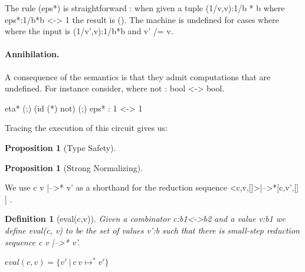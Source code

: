 \documentclass[preprint]{sigplanconf}
\newcommand{\xcomment}[2]{\textbf{#1:~\textsl{#2}}}
\newcommand{\roshan}[1]{\xcomment{Roshan}{#1}}
\newcommand{\asterix}[0]{*}
\newtheorem{definition}[theorem]{Definition}
\newtheorem{proposition}[theorem]{Proposition}
\begin{document}



The rule {{(eps*)}} is straightforward : when given a tuple
{{(1/v,v):1/b * b}} where {{eps*:1/b*b <-> 1}} the result is
{{()}}. The machine is undefined for cases where where the input is
{{(1/v',v):1/b*b}} and {{v' /= v}}.

\paragraph*{Annihilation.} 
A consequence of the semantics is that they admit computations that
are undefined. For instance consider, where {{not : bool <-> bool}}. 

{{eta* (;) (id (*) not) (;) eps* : 1 <-> 1}}

\noindent
Tracing the execution of this circuit gives us: 



\begin{proposition}[Type Safety]
  
\end{proposition}

\begin{proposition}[Strong Normalizing]
  
\end{proposition}

\noindent
We use {{c v |-->* v'}} as a shorthand for the reduction sequence
{{<c,v,[]>|-->*{[c,v',[] ]} }}.

\begin{definition}[eval(c,v)]

Given a combinator {{c:b1<->b2}} and a value {{v:b1}} we define
{{eval(c, v)}} to be the set of values {{v':b}} such that there is
small-step reduction sequence {{c v |-->* v'}}.

$eval(c, v) = \{v'~|~ c~ v\mapsto^{\asterix} v' \} $
\end{definition}
\end{document}
